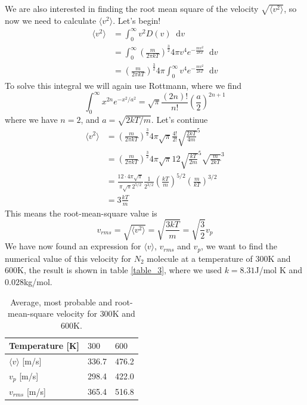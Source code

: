 \documentclass[a4paper,10pt, english]{article}
\newcommand*\diff{\mathop{}\!\mathrm{d}}
\begin{document}
We are also interested in finding the root mean square of the velocity $\sqrt{\langle v^2\rangle }$, so now we need to calculate $\langle v^2\rangle$. Let's begin!
\begin{align*}
    \langle v^2\rangle &= \int_0^\infty v^2D(v)\diff v \\
    &= \int_0^\infty \left(\frac{m}{2\pi kT}\right)^{\frac{3}{2}}4\pi v^4e^{-\frac{mv^2}{2kT}} \diff v \\
    &= \left(\frac{m}{2\pi kT}\right)^{\frac{3}{2}}4\pi \int_0^\infty v^4e^{-\frac{mv^2}{2kT}} \diff v
\end{align*}
To solve this integral we will again use Rottmann, where we find
\begin{equation}
    \int_0^\infty x^{2n} e^{-x^2/a^2} = \sqrt{\pi}\frac{\left(2n\right)!}{n!}\left(\frac{a}{2}\right)^{2n+1}
\end{equation}
where we have $n=2$, and $a=\sqrt{2kT/m}$. Let's continue
\begin{align*}
    \langle v^2\rangle &= \left(\frac{m}{2\pi kT}\right)^{\frac{3}{2}}4\pi \sqrt{\pi}\frac{4!}{2!} \sqrt{\frac{2kT}{4m}}^5 \\
    &= \left(\frac{m}{2\pi kT}\right)^{\frac{3}{2}}4\pi\sqrt{\pi}12 \sqrt{\frac{kT}{2m}}^5\sqrt{\frac{m}{2kT}}^3 \\
    &= \frac{12\cdot 4 \pi\sqrt{\pi}}{\pi\sqrt{\pi}2^{5/2}}\frac{1}{2^{3/2}}\left(\frac{kT}{m}\right)^{5/2}\left(\frac{m}{kT}\right)^{3/2} \\
    &= 3\frac{kT}{m}
\end{align*}
This means the root-mean-square value is
\begin{equation}
    v_{rms} = \sqrt{\langle v^2\rangle} = \sqrt{\frac{3kT}{m}} = \sqrt{\frac{3}{2}}v_p
\end{equation}
We have now found an expression for $\langle v \rangle$, $v_{rms}$ and $v_p$, we want to find the numerical value of this velocity for $N_2$ molecule at a temperature of $300$K and $600$K, the result is shown in table \vref{table_3}, where we used $k=8.31$J/mol K and $0.028$kg/mol.
\begin{table}[]
    \begin{center}
    \caption{Average, most probable and root-mean-square velocity for $300$K and $600$K.}
    \begin{tabular}{@{}lll@{}}
    \toprule
    Temperature {[}K{]}                               & $300$ & $600$ \\ \midrule
    $\langle v \rangle$ [m/s] & 336.7 & 476.2 \\
    $v_p$ [m/s]                                            & 298.4 & 422.0 \\
    $v_{rms}$ [m/s]                                         & 365.4 & 516.8 \\ \bottomrule
    \end{tabular}
    \label{table_3}
    \end{center}
\end{table}
\end{document}

